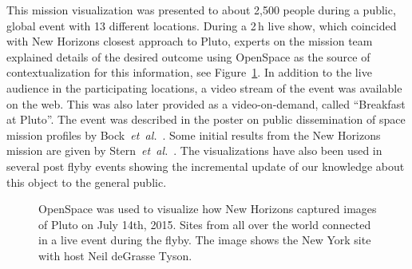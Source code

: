 \documentclass[journal]{vgtc}                %
\newcommand{\alexcomment}[1]{\textbf{[-Alex-~}
    \textcolor{magenta}{#1}
    \textbf{~]}}
\newcommand{\fig}[1]{Figure~\ref{fig:#1}}
\newcommand{\etal}{\emph{et~al.}}
\begin{document}
This mission visualization was presented to about 2,500 people during a public, global event with 13 different locations.
During a 2\,h live show, which coincided with New Horizons closest approach to Pluto, experts on the mission team explained details of the desired outcome using OpenSpace as the source of contextualization for this information, see \fig{nh_event}.
In addition to the live audience in the participating locations, a video stream of the event was available on the web. This was also later provided as a video-on-demand, called ``Breakfast at Pluto''.
The event was described in the poster on public dissemination of space mission profiles by Bock~\etal~\cite{Bock_2015}.
Some initial results from the New Horizons mission are given by Stern~\etal~\cite{stern2015pluto}.
The visualizations have also been used in several post flyby events showing the incremental update of our knowledge about this object to the general public.

\begin{figure}[b!]
\vspace*{-4mm}
    \centering
        \caption{OpenSpace was used to visualize how New Horizons captured images of Pluto on July 14th, 2015. Sites from all over the world connected in a live event during the flyby. The image shows the New York site with host Neil deGrasse Tyson.}%
    \label{fig:nh_event}
\end{figure}

\end{document}
